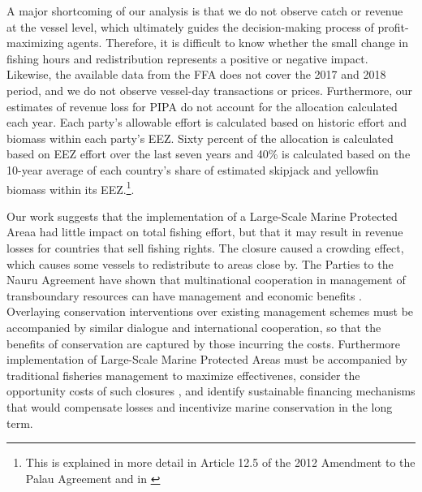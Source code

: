 \documentclass[9p,twocolumn,twoside,lineno]{pnas-new}
\begin{document}
A major shortcoming of our analysis is that we do not observe catch or revenue at the vessel level, which ultimately guides the decision-making process of profit-maximizing agents. Therefore, it is difficult to know whether the small change in fishing hours and redistribution represents a positive or negative impact. Likewise, the available data from the FFA does not cover the 2017 and 2018 period, and we do not observe vessel-day transactions or prices. Furthermore, our estimates of revenue loss for PIPA do not account for the allocation calculated each year. Each party’s allowable effort is calculated based on historic effort and biomass within each party’s EEZ. Sixty percent of the allocation is calculated based on EEZ effort over the last seven years and 40\% is calculated based on the 10-year average of each country’s share of estimated skipjack and yellowfin biomass within its EEZ.\footnote{This is explained in more detail in Article 12.5 of the 2012 Amendment to the Palau Agreement and in \cite{Hagrannsoknir2014}}.

Our work suggests that the implementation of a Large-Scale Marine Protected Areaa had little impact on total fishing effort, but that it may result in revenue losses for countries that sell fishing rights. The closure caused a crowding effect, which causes some vessels to redistribute to areas close by. The Parties to the Nauru Agreement have shown that multinational cooperation in management of transboundary resources can have management and economic benefits \cite{havice_2013,aqorau_2018}. Overlaying conservation interventions over existing management schemes must be accompanied by similar dialogue and international cooperation, so that the benefits of conservation are captured by those incurring the costs. Furthermore implementation of Large-Scale Marine Protected Areas must be accompanied by traditional fisheries management to maximize effectivenes, consider the opportunity costs of such closures \cite{smith_2010}, and identify sustainable financing mechanisms \cite{mallin_2019} that would compensate losses and incentivize marine conservation in the long term.
\end{document}
